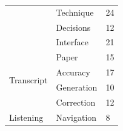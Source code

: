 \begin{table}[h]
{\begin{tabular}{|l|l|l|}
      & Technique & 24 \\ \cline{2-3} %
      & Decisions & 12 \\ \cline{2-3} %
      & Interface & 21 \\ \hline %
      \multirow{4}{*}{Transcript}
      & Paper & 15 \\ \cline{2-3}%
      & Accuracy & 17 \\ \cline{2-3} %
      & Generation & 10 \\ \cline{2-3} %
      & Correction & 12 \\ \hline %
      \multirow{3}{*}{Listening}
      & Navigation & 8 \\ \cline{2-3} %

\end{tabular}}
\end{table}
